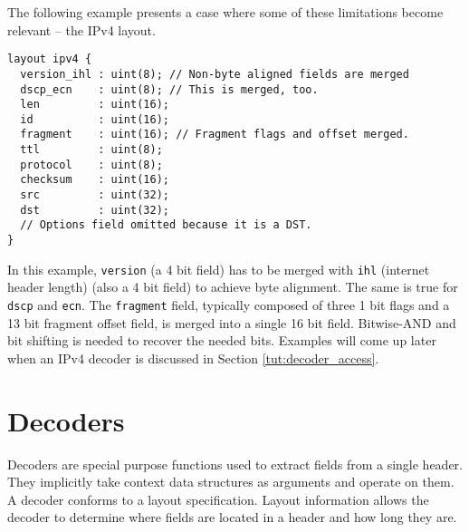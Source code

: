 The following example presents a case where some of these limitations become relevant -- the IPv4 layout.

\begin{codepage}
\begin{lstlisting}
layout ipv4 {
  version_ihl : uint(8); // Non-byte aligned fields are merged
  dscp_ecn    : uint(8); // This is merged, too.
  len         : uint(16);
  id          : uint(16);
  fragment    : uint(16); // Fragment flags and offset merged.
  ttl         : uint(8);
  protocol    : uint(8);
  checksum    : uint(16);
  src         : uint(32);
  dst         : uint(32);
  // Options field omitted because it is a DST.
}
\end{lstlisting}
\end{codepage}

In this example, \texttt{version} (a 4 bit field) has to be
merged with \texttt{ihl} (internet header length) (also a 4 bit field) to
achieve byte alignment. The same is true for \texttt{dscp} and \texttt{ecn}. The
\texttt{fragment} field, typically composed of three 1 bit flags and a 13 bit
fragment offset field, is merged into a single 16 bit field. 
Bitwise-AND and bit shifting is needed to recover the needed bits.
Examples will come up later when an IPv4 decoder is discussed in
Section \ref{tut:decoder_access}.

\section{Decoders} \label{tut:decoder}

Decoders are special purpose functions
used to extract fields from a single header. 
They implicitly take context data structures as arguments and 
operate on them.
A decoder conforms to a layout specification.
Layout information allows the decoder to determine where fields
are located in a header and how long they are.


%
%
%
%


